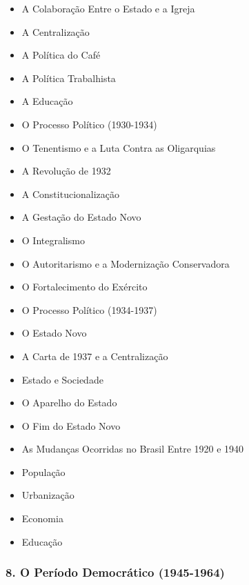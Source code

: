\documentclass[a4paper,12pt]{article}[abntex2]
\begin{document}
\begin{itemize}
\item A Colaboração Entre o Estado e a Igreja
\item A Centralização
\item A Política do Café
\item A Política Trabalhista
\item A Educação
\item O Processo Político (1930-1934)
\item O Tenentismo e a Luta Contra as Oligarquias
\item A Revolução de 1932
\item A Constitucionalização
\item A Gestação do Estado Novo
\item O Integralismo
\item O Autoritarismo e a Modernização Conservadora
\item O Fortalecimento do Exército
\item O Processo Político (1934-1937)
\item O Estado Novo
\item A Carta de 1937 e a Centralização
\item Estado e Sociedade
\item O Aparelho do Estado
\item O Fim do Estado Novo
\item As Mudanças Ocorridas no Brasil Entre 1920 e 1940
\item População
\item Urbanização
\item Economia
\item Educação
\end{itemize}
\subsubsection*{8. O Período Democrático (1945-1964)}
\end{document}
